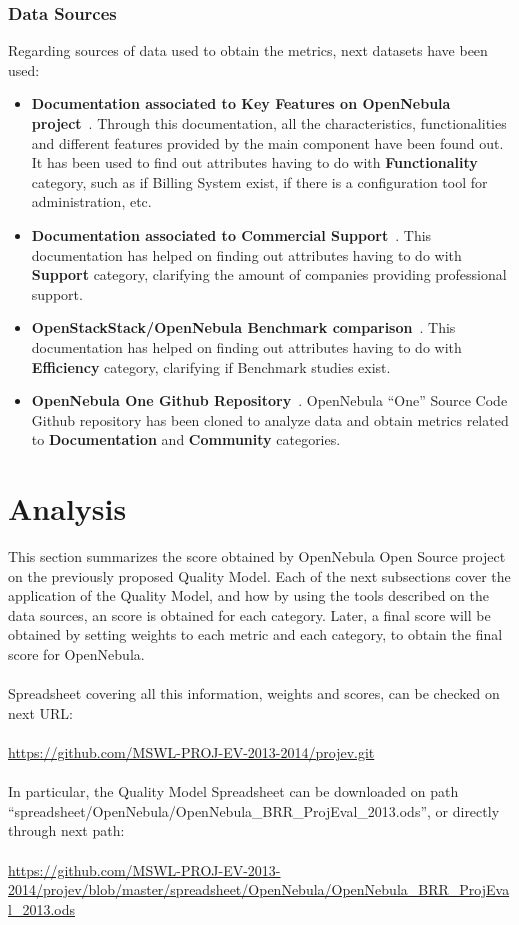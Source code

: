 \documentclass[11pt]{article}
\begin{document}
\subsubsection{Data Sources}
Regarding sources of data used to obtain the metrics, next datasets have been used:
\begin{itemize}\itemsep0pt
\item{\textbf{Documentation associated to Key Features on OpenNebula project}~\cite{OPNEB00}}. Through this documentation, all the characteristics, functionalities and different features provided by the main component have been found out. It has been used to find out attributes having to do with \textbf{Functionality} category, such as if Billing System exist, if there is a configuration tool for administration, etc.
\item{\textbf{Documentation associated to Commercial Support}~\cite{OPNEB01}}. This documentation has helped on finding out attributes having to do with \textbf{Support} category, clarifying the amount of companies providing professional support.
\item{\textbf{OpenStackStack/OpenNebula Benchmark comparison}~\cite{BENCH00}}. This documentation has helped on finding out attributes having to do with \textbf{Efficiency} category, clarifying if Benchmark studies exist.
\item{\textbf{OpenNebula One Github Repository}~\cite{OPNEB02}}. OpenNebula ``One'' Source Code Github repository has been cloned to analyze data and obtain metrics related to \textbf{Documentation} and \textbf{Community} categories.
\end{itemize}

\section{Analysis}\label{sec:analysis}

This section summarizes the score obtained by OpenNebula Open Source project on the previously proposed Quality Model. Each of the next subsections cover the application of the Quality Model, and how by using the tools described on the data sources, an score is obtained for each category. Later, a final score will be obtained by setting weights to each metric and each category, to obtain the final score for OpenNebula.\\
\\
Spreadsheet covering all this information, weights and scores, can be checked on next URL:\\
\\
\url{https://github.com/MSWL-PROJ-EV-2013-2014/projev.git}\\
\\
In particular, the Quality Model Spreadsheet can be downloaded on path ``spreadsheet/OpenNebula/OpenNebula\_BRR\_ProjEval\_2013.ods'', or directly through next path:\\
\\
\url{https://github.com/MSWL-PROJ-EV-2013-2014/projev/blob/master/spreadsheet/OpenNebula/OpenNebula\_BRR\_ProjEval\_2013.ods}
\end{document}
